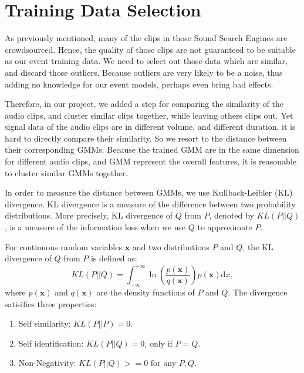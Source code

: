 

\section{Training Data Selection}
As previously mentioned, many of the clips in those Sound Search Engines are crowdsourced. 
Hence, the quality of those clips are not guaranteed to be suitable as our event training data.    
We need to select out those data which are similar, and discard those outliers. 
Because outliers are very likely to be a noise, thus adding no knowledge for our event models, perhaps even bring bad effects. 

Therefore, in our project, we added a step for comparing the similarity of the audio clips, and cluster similar clips together, while leaving others clips out. 
Yet signal data of the audio clips are in different volume, and different duration, it is hard to directly compare their similarity. 
So we resort to the distance between their corresponding GMMs. 
Because the trained GMM are in the same dimension for different audio clips, and GMM represent the overall features, it is reasonable to cluster similar GMMs together. 

In order to measure the distance between GMMs, we use Kullback-Leibler (KL) divergence. 
KL divergence is a measure of the difference between two probability distributions. 
More precisely, KL divergence of $Q$ from $P$, denoted by $KL(P||Q)$, is a measure of the information loss when we use $Q$ to approximate $P$.

For continuous random variables $\mathbf{x}$ and two distributions $P$ and $Q$, the KL divergence of $Q$ from $P$ is defined as:
\begin{equation}
KL(P||Q) = \int_{-\infty}^{+\infty}\ln(\frac{p(\mathbf{x})}{q(\mathbf{x})})p(\mathbf{x})\mathrm{d}x,
\label{eq:kl}
\end{equation}
where $p(\mathbf{x})$ and $q(\mathbf{x})$ are the density functions of $P$ and $Q$.
The divergence satisifies three properties: 
\begin{enumerate}
\item{Self similarity: $KL(P||P) = 0$}. 
\item{Self identification: $KL(P||Q) = 0$, only if $P = Q$}. 
\item{Non-Negativity: $KL(P||Q) >= 0$ for any $P, Q$}. 
\end{enumerate}

